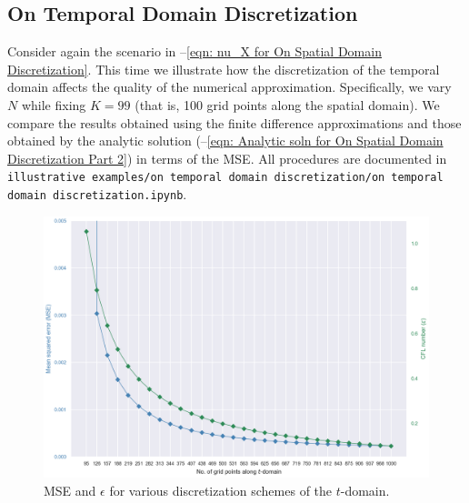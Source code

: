 \documentclass{article}
\begin{document}
\subsection{On Temporal Domain Discretization}
\label{subsec: On Temporal Domain Discretization}

Consider again the scenario in
--\ref{eqn: nu_X for On Spatial Domain Discretization}.
This time we illustrate how the discretization of the temporal domain affects the quality of the numerical approximation.
Specifically, we vary $N$ while fixing $K=99$ (that is, 100 grid points along the spatial domain).
We compare the results obtained using the finite difference approximations and those obtained by the analytic solution
(--\ref{eqn: Analytic soln for On Spatial Domain Discretization Part 2})
in terms of the MSE.
All procedures are documented in
{\tt illustrative examples/on temporal domain discretization/on temporal domain discretization.ipynb}.

\begin{figure}[t!]
	\centering
	\includegraphics[scale=0.7]{on temporal domain discretization - mse and cfl.png}
	\caption{MSE and $\epsilon$ for various discretization schemes of the $t$-domain.}
	\label{fig: On Temporal Domain Discretization results: MSE and CFL}
\end{figure}
\end{document}
